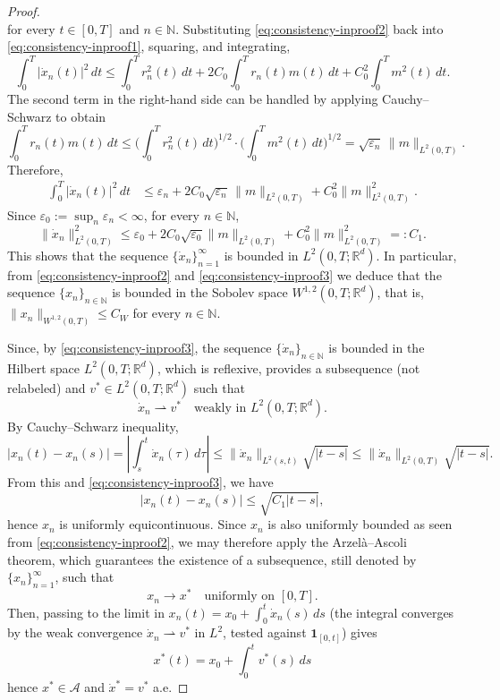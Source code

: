 \documentclass[11pt]{elsarticle}
\theoremstyle{definition}
\theoremstyle{remark}
\numberwithin{equation}{section}
\begin{document}
\begin{proof}
\begin{equation}
		\end{equation}
		for every $t \in [0,T]$ and $n\in\mathbb{N}$.
		Substituting \eqref{eq:consistency-inproof2} back into \eqref{eq:consistency-inproof1}, squaring, and integrating,
		\[
		\int_0^T |\dot{x}_n(t)|^2 \, dt \le \int_0^T r_n^2(t) \, dt + 2C_0 \int_0^T r_n(t) m(t) \, dt 
		+ C_0^2 \int_0^T m^2(t) \, dt.
		\]
		The second term in the right-hand side can be handled by
		applying Cauchy--Schwarz to obtain
		\[
		\int_0^T r_n(t) m(t) \, dt \le \Big(\int_0^T r_n^2(t) \, dt\Big)^{1/2} \cdot \Big(\int_0^T m^2(t) \, dt \Big)^{1/2} 
		= \sqrt{\varepsilon_n} \, \|m\|_{L^2(0,T)}.
		\]
		Therefore,
		\begin{align*}
			\int_0^T |\dot{x}_n(t)|^2 \, dt 
			&\le \varepsilon_n + 2C_0\sqrt{\varepsilon_n} \, \|m\|_{L^2(0,T)} + C_0^2 \|m\|_{L^2(0,T)}^2.
		\end{align*}
		Since $\varepsilon_0 := \sup_n \varepsilon_n < \infty$, for every $n\in\mathbb{N}$,
		\begin{equation}\label{eq:consistency-inproof3}
			\|\dot{x}_n\|^2_{L^2(0,T)} \le \varepsilon_0 + 2 C_0 \sqrt{\varepsilon_0} \|m\|_{L^2(0,T)} +  C^2 _0\|m\|^2_{L^2(0,T)} =: C_1.
		\end{equation}
		This shows that
		the sequence $\{\dot{x}_n\}_{n=1}^{\infty}$ is bounded in $L^2(0,T; \mathbb{R}^d)$.
		In particular, from \eqref{eq:consistency-inproof2} and \eqref{eq:consistency-inproof3} we deduce that
		the sequence $\{x_n\}_{n\in\mathbb{N}}$ is bounded in the Sobolev space $W^{1,2}(0,T; \mathbb{R}^d)$, that is, $\|x_n\|_{W^{1,2}(0,T)} \le C_W$ for every $n\in\mathbb{N}$.
		
		Since, by \eqref{eq:consistency-inproof3}, the sequence $\{\dot{x}_n\}_{n\in\mathbb{N}}$ is bounded in the Hilbert space $L^2(0,T; \mathbb{R}^d)$, which is reflexive, \cite[Theorem 3.18]{brezis_2011} provides a subsequence (not relabeled) and $v^*\in L^2(0,T;\mathbb{R}^d)$ such that
		\[
		\dot{x}_n \rightharpoonup v^* \quad \text{weakly in } L^2(0,T; \mathbb{R}^d).
		\]
		By Cauchy--Schwarz inequality,
		\[
		|x_n(t) - x_n(s)| = \left|\int_s^t \dot{x}_n(\tau) \, d\tau\right| 
		\le \|\dot{x}_n\|_{L^2(s,t)} \sqrt{|t - s|} 
		\le \|\dot{x}_n\|_{L^2(0,T)} \sqrt{|t - s|}.
		\]
		From this and \eqref{eq:consistency-inproof3}, we have
		\[
		|x_n(t) - x_n(s)| \le \sqrt{C_1|t - s|},
		\]
		hence $x_n$ is uniformly equicontinuous.
		Since $x_n$ is also uniformly bounded as seen from \eqref{eq:consistency-inproof2},
		we may therefore apply the Arzelà–Ascoli theorem, which guarantees the existence of a subsequence, still denoted by $\{x_n\}_{n=1}^{\infty}$, such that
		\[
		x_n \to x^* \quad \text{uniformly on } [0,T].
		\]
		Then, passing to the limit in $x_n(t) = x_0 + \int_0^t \dot{x}_n(s) \, ds$ (the integral converges by the weak convergence $\dot{x}_n \rightharpoonup v^*$ in $L^2$, tested against $\mathbf{1}_{[0,t]}$) gives 
		\[
		x^*(t) = x_0 + \int_0^t v^*(s) \, ds
		\]
		hence $x^* \in \mathcal{A}$ and $\dot{x}^* = v^*$ a.e.
		

\end{proof}
\end{document}
